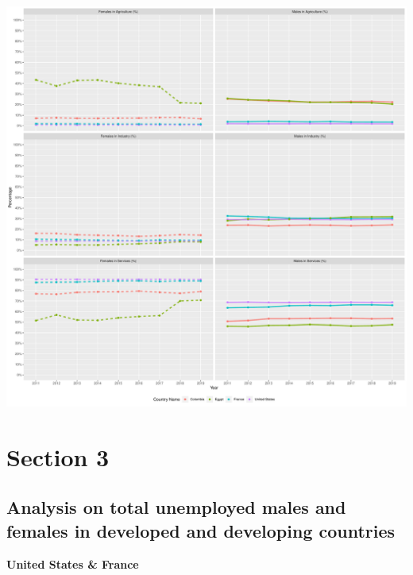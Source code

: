 \documentclass[11pt,a4paper,]{article}
\let\origfigure\figure
\let\endorigfigure\endfigure
\renewenvironment{figure}[1][2] {
    \expandafter\origfigure\expandafter[H]
} {
    \endorigfigure
}
\begin{document}
\begin{figure}
\centering
\includegraphics{The_Outsiders_5513_files/figure-latex/allvars-1.pdf}
\caption{\label{fig:allvars}Gender Workforce by Industry}
\end{figure}

\clearpage

\section*{Section 3}

\hypertarget{analysis-on-total-unemployed-males-and-females-in-developed-and-developing-countries}{%
\subsection{Analysis on total unemployed males and females in developed and developing countries}\label{analysis-on-total-unemployed-males-and-females-in-developed-and-developing-countries}}

\textbf{United States \& France}
\end{document}
